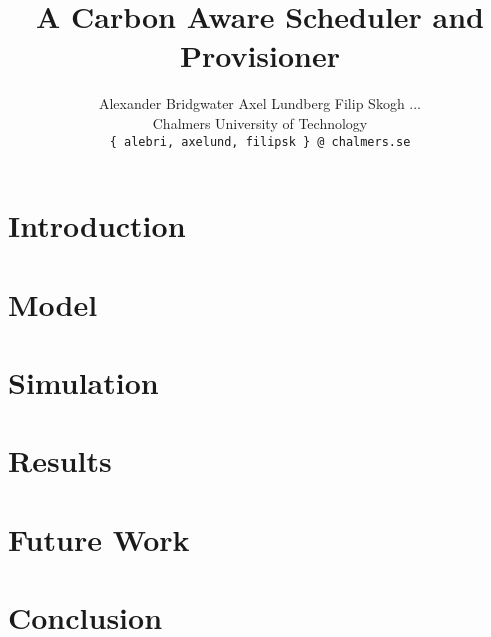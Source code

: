 \documentclass[a4paper, twocolumn]{article}
\title{A Carbon Aware Scheduler and Provisioner}
\author{Alexander Bridgwater\textsuperscript{\textdagger} \quad
    Axel Lundberg\textsuperscript{\textdagger} \quad
    Filip Skogh\textsuperscript{\textdagger} \quad ...\\
    \textdagger Chalmers University of Technology \\
    \small\texttt{\{ alebri, axelund, filipsk \} @ chalmers.se}
    }
\date{}
\begin{document}

\maketitle

%


\section{Introduction}



\section{Model}


\section{Simulation}


\section{Results}


\section{Future Work}


\section{Conclusion}





\newpage

%
\end{document}
